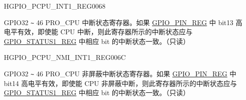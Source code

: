 \begin{register}{H}{GPIO\_PCPU\_INT1\_REG}{\hexprefix{}0068}\label{regdesc:GPIOPCPUINT1REG}
%
%
\regnewline%
\begin{regdesc}\begin{reglist}
\label{fielddesc:GPIOPROCPU1INT}\item [GPIO\_PROCPU1\_INT] GPIO32 \verb+~+ 46 PRO\_CPU 中断状态寄存器。如果 \hyperref[regdesc:GPIOPINNREG]{GPIO\_PIN\_REG} 中 bit13 高电平有效，即使能 CPU 中断，则此寄存器所示的中断状态应与 \hyperref[regdesc:GPIOSTATUS1REG]{GPIO\_STATUS1\_REG} 中相应 bit 的中断状态一致。（只读）
\end{reglist}\end{regdesc}
\end{register}


\begin{register}{H}{GPIO\_PCPU\_NMI\_INT1\_REG}{\hexprefix{}006C}\label{regdesc:GPIOPCPUNMIINT1REG}
%
%
\regnewline%
\begin{regdesc}\begin{reglist}
\label{fielddesc:GPIOPROCPUNMI1INT}\item [GPIO\_PROCPU\_NMI1\_INT] GPIO32 \verb+~+ 46 PRO\_CPU 非屏蔽中断状态寄存器。如果 \hyperref[regdesc:GPIOPINNREG]{GPIO\_PIN\_REG} 中 bit14 高电平有效，即使能 CPU 非屏蔽中断，则此寄存器所示的中断状态应与 \hyperref[regdesc:GPIOSTATUS1REG]{GPIO\_STATUS1\_REG} 中相应 bit 的中断状态一致。（只读）
\end{reglist}\end{regdesc}
\end{register}




